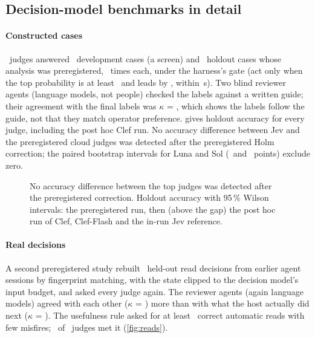 \subsection{Decision-model benchmarks in detail}\label{sec:judges}

\paragraph{Constructed cases} \NumBase\ judges answered \DevN\ development cases (a screen) and \HoldN\ holdout cases
whose analysis was preregistered, \HoldReps\ times each, under the harness's gate (act only when the top probability
is at least \MinP\ and leads by \MinMargin, within \TimeoutS\,s). Two blind reviewer agents (language models, not people) checked the labels
against a written guide; their agreement with the final labels was $\kappa$ = \KappaHoldAB, which shows the labels
follow the guide, not that they match operator preference.  gives holdout
accuracy for every judge, including the post hoc Clef run. No accuracy difference between Jev and the preregistered
cloud judges was detected after the preregistered Holm correction; the paired bootstrap intervals for Luna and Sol
(\LunaHoldRAccDiffCI\ and \SolHoldRAccDiffCI\ points) exclude zero.

\begin{figure}[tbp]
\centering
{}\par\smallskip

\caption{No accuracy difference between the top judges was detected after the preregistered correction. Holdout accuracy with 95\,\% Wilson intervals: the preregistered run, then (above the gap) the post hoc run
of Clef, Clef-Flash and the in-run Jev reference.}
\label{fig:accuracy}
\end{figure}

\paragraph{Real decisions} A second preregistered study rebuilt \TrN\ held-out read decisions from earlier agent
sessions by fingerprint matching, with the state clipped to the decision model's input budget, and asked every judge
again. The reviewer agents (again language models) agreed with each other ($\kappa$ = \TrKappaAB) more than with what
the host actually did next ($\kappa$ = \TrKappaOutcome). The usefulness rule asked for at least \TrUsefulMinReads\ correct automatic reads
with few misfires; \TrNUseful\ of \NumBase\ judges met it (\cref{fig:reads}).

